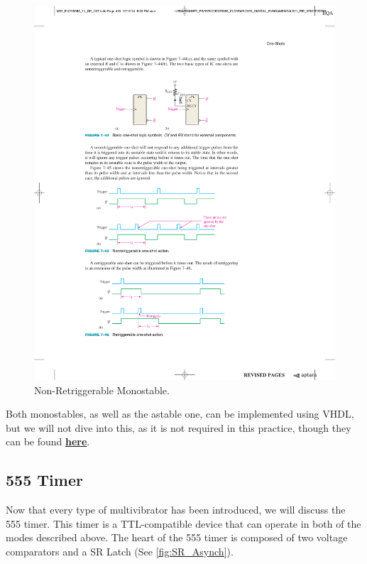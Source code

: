 \begin{figure}[H]
    \centering
    \includegraphics[scale = 1]{Graphics/VHDL/Practice 2/GRAPHICS/MONOSTABLE/NON-RETRIGGERABLE.pdf}
    \caption{Non-Retriggerable Monostable. ~\autocite{FLOYD}}
    \label{fig:NON-RETRIGGERABLE}
\end{figure}


Both monostables, as well as the astable one, can be implemented using VHDL, but we will not dive into this, as it is not required in this practice, though they can be found \href{https://drive.google.com/open?id=1J-T80ZyF3isizOMjBf8xZOD7rw0KesP-}{\textbf{here}}.

\clearpage

\subsection{555 Timer}

Now that every type of multivibrator has been introduced, we will discuss the 555 timer. This timer is a TTL-compatible device that can operate in both of the modes described above. The heart of the 555 timer is composed of two voltage comparators and a SR Latch (See \ref{fig:SR_Asynch}). \medskip

